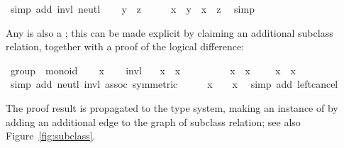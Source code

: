 \begin{isabellebody}
\ {\isacharparenleft}simp\ add{\isacharcolon}\ invl\ neutl{\isacharparenright}\isanewline
{}\isamarkupfalse%
\isanewline
\ \ \isamarkupfalse%
\ {\isachardoublequoteopen}y\ {\isacharequal}\ z{\isachardoublequoteclose}\isanewline
\ \ \isamarkupfalse%
\ \isamarkupfalse%
\ {\isachardoublequoteopen}x\ {\isasymoplus}\ y\ {\isacharequal}\ x\ {\isasymoplus}\ z{\isachardoublequoteclose}\ \isamarkupfalse%
\ simp\isanewline
{}\isamarkupfalse%
%
\endisatagproof
{\isafoldproof}%
%
\isadelimproof
%
\endisadelimproof
%
\begin{isamarkuptext}%
\noindent Any  is also a ; this
can be made explicit by claiming an additional subclass relation,
together with a proof of the logical difference:%
\end{isamarkuptext}%
\isamarkuptrue%
\isamarkupfalse%
\ group\ {\isasymsubseteq}\ monoid\isanewline
%
\isadelimproof
%
\endisadelimproof
%
\isatagproof
{}\isamarkupfalse%
\isanewline
\ \ \isamarkupfalse%
\ x\isanewline
\ \ \isamarkupfalse%
\ invl\ \isamarkupfalse%
\ {\isachardoublequoteopen}{\isasymdiv}\ x\ {\isasymoplus}\ x\ {\isacharequal}\ {\isasymzero}{\isachardoublequoteclose}\ \isacommand{{\isachardot}}\isamarkupfalse%
\isanewline
\ \ \isamarkupfalse%
\ \isamarkupfalse%
\ {\isachardoublequoteopen}{\isasymdiv}\ x\ {\isasymoplus}\ {\isacharparenleft}x\ {\isasymoplus}\ {\isasymzero}{\isacharparenright}\ {\isacharequal}\ {\isasymdiv}\ x\ {\isasymoplus}\ x{\isachardoublequoteclose}\isanewline
\ \ \ \ \isamarkupfalse%
\ {\isacharparenleft}simp\ add{\isacharcolon}\ neutl\ invl\ assoc\ {\isacharbrackleft}symmetric{\isacharbrackright}{\isacharparenright}\isanewline
\ \ \isamarkupfalse%
\ \isamarkupfalse%
\ {\isachardoublequoteopen}x\ {\isasymoplus}\ {\isasymzero}\ {\isacharequal}\ x{\isachardoublequoteclose}\ \isamarkupfalse%
\ {\isacharparenleft}simp\ add{\isacharcolon}\ left{\isacharunderscore}cancel{\isacharparenright}\isanewline
{}\isamarkupfalse%
%
\endisatagproof
{\isafoldproof}%
%
\isadelimproof
%
\endisadelimproof
%
\begin{isamarkuptext}%
\noindent The proof result is propagated to the type system,
making  an instance of  by adding an
additional edge to the graph of subclass relation; see also
Figure~\ref{fig:subclass}.


\end{isamarkuptext}
\end{isabellebody}
